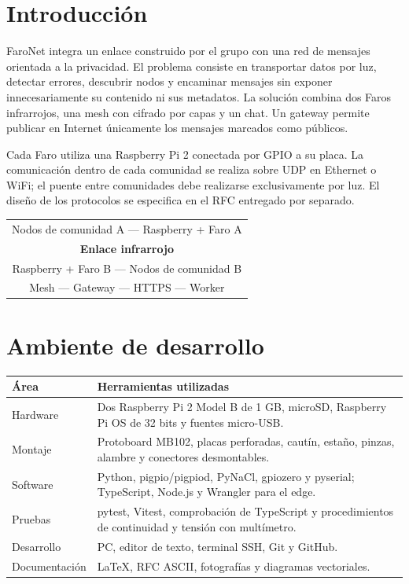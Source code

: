 \documentclass[11pt,letterpaper]{article}
\begin{document}

\section{Introducción}

FaroNet integra un enlace construido por el grupo con una red de mensajes
orientada a la privacidad. El problema consiste en transportar datos por luz,
detectar errores, descubrir nodos y encaminar mensajes sin exponer innecesariamente
su contenido ni sus metadatos. La solución combina dos Faros infrarrojos, una
mesh con cifrado por capas y un chat. Un gateway permite publicar en Internet
únicamente los mensajes marcados como públicos.

Cada Faro utiliza una Raspberry Pi 2 conectada por GPIO a su placa. La
comunicación dentro de cada comunidad se realiza sobre UDP en Ethernet o WiFi;
el puente entre comunidades debe realizarse exclusivamente por luz. El diseño
de los protocolos se especifica en el RFC entregado por separado.

\begin{center}
\begin{tabular}{c}
Nodos de comunidad A --- Raspberry + Faro A\\
\textbf{Enlace infrarrojo}\\
Raspberry + Faro B --- Nodos de comunidad B\\[3pt]
Mesh --- Gateway --- HTTPS --- Worker
\end{tabular}
\end{center}

\section{Ambiente de desarrollo}

\begin{tabularx}{\linewidth}{P{3.2cm} X}
\toprule
Área & Herramientas utilizadas\\
\midrule
Hardware & Dos Raspberry Pi 2 Model B de 1 GB, microSD, Raspberry Pi OS de 32 bits y fuentes micro-USB.\\
Montaje & Protoboard MB102, placas perforadas, cautín, estaño, pinzas, alambre y conectores desmontables.\\
Software & Python, pigpio/pigpiod, PyNaCl, gpiozero y pyserial; TypeScript, Node.js y Wrangler para el edge.\\
Pruebas & pytest, Vitest, comprobación de TypeScript y procedimientos de continuidad y tensión con multímetro.\\
Desarrollo & PC, editor de texto, terminal SSH, Git y GitHub.\\
Documentación & LaTeX, RFC ASCII, fotografías y diagramas vectoriales.\\
\bottomrule
\end{tabularx}
\end{document}
